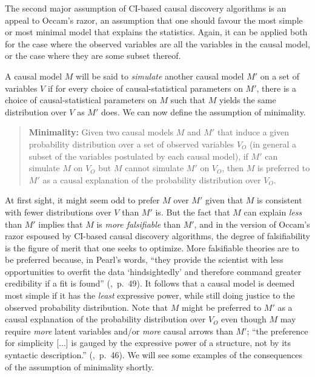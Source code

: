 \documentclass[12pt,onecolumn,nofootinbib]{revtex4-2}
\begin{document}
The second major assumption of CI-based causal discovery algorithms is an appeal to Occam's razor, an assumption that one should favour the most simple or most minimal model that explains the statistics.  Again, it can be applied both for the case where the observed variables are all the variables in the causal model, or the case where they are some subset thereof.

A causal model $M$ will be said to \emph{simulate} another causal model $M'$ on a set of variables $V$ if for every choice of causal-statistical parameters on $M'$, there is a choice of causal-statistical parameters on $M$ such that $M$ yields the same distribution over $V$ as $M'$ does. We can now define the assumption of minimality.

\begin{quote}
\textbf{Minimality: } Given two causal models $M$ and $M'$ that induce a given probability distribution over a set of observed variables $V_O$ (in general a subset of the variables postulated by each causal model), if $M'$ can simulate $M$ on $V_O$ but $M$ cannot simulate $M'$ on $V_O$, then $M$ is preferred to $M'$ as a causal explanation of the probability distribution over $V_O$.
\end{quote}

At first sight, it might seem odd to prefer $M$ over $M'$ given that $M$ is consistent with fewer distributions over $V$ than $M'$ is.  But the fact that $M$ can explain \emph{less} than $M'$ implies that $M$ is \emph{more falsifiable} than $M'$, and in the version of Occam's razor espoused by CI-based causal discovery algorithms, the degree of falsifiability is the figure of merit that one seeks to optimize. More falsifiable theories are to be preferred because, in Pearl's words, ``they provide the scientist with less opportunities to overfit the data `hindsightedly' and therefore command greater credibility if a fit is found'' (\cite{Pearl2009},~p.~49).  It follows that a causal model is deemed most simple if it has the \emph{least} expressive power, while still doing justice to the observed probability distribution.  Note that $M$ might be preferred to $M'$ as a causal explanation of the probability distribution over $V_O$ even though $M$ may require \emph{more} latent variables and/or \emph{more} causal arrows than $M'$;  ``the preference for simplicity [...] is gauged by the expressive power of a structure, not by its syntactic description.'' (\cite{Pearl2009},~p.~46).
We will see some examples of the consequences of the assumption of minimality shortly.
\end{document}
